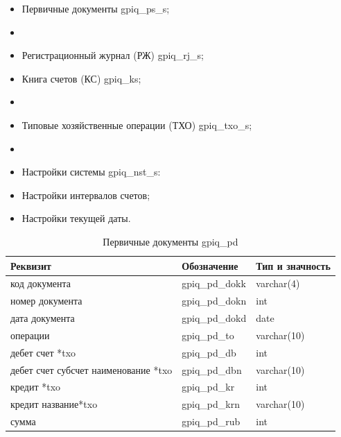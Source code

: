 \begin{itemize}
    \item Первичные документы gpiq\_ps\_s;
    \item[] \hspace{0pt}
    \item Регистрационный журнал (РЖ) gpiq\_rj\_s;
    \item Книга счетов (КС) gpiq\_ks;
    \item[] \hspace{0pt}  
    \item Типовые хозяйственные операции (ТХО) gpiq\_txo\_s;
    \item[] \hspace{0pt}     
    \item Настройки системы gpiq\_nst\_s:
    \item Настройки интервалов счетов;
    \item Настройки текущей даты.
\end{itemize}

\begin{table}[h!p]
    \centering
    \scriptsize
    \caption{Первичные документы gpiq\_pd}
    \begin{tabular}{|l|l|l|} 

\hline
\textbf{Реквизит}                   &\textbf{Обозначение}   &\textbf{Тип и значность}   \\ \hline
код документа                       &gpiq\_pd\_dokk         &varchar(4)                 \\ \hline
номер документа                     &gpiq\_pd\_dokn         &int                        \\ \hline
дата документа                      &gpiq\_pd\_dokd         &date                       \\ \hline
операции                            &gpiq\_pd\_to           &varchar(10)                \\ \hline
дебет счет *txo                     &gpiq\_pd\_db           &int                        \\ \hline
дебет счет субсчет наименование *txo&gpiq\_pd\_dbn          &varchar(10)                \\ \hline
кредит  *txo                        &gpiq\_pd\_kr           &int                        \\ \hline
кредит название*txo                 &gpiq\_pd\_krn          &varchar(10)                \\ \hline
сумма                               &gpiq\_pd\_rub          &int                        \\ \hline

    \end{tabular}
\end{table}

